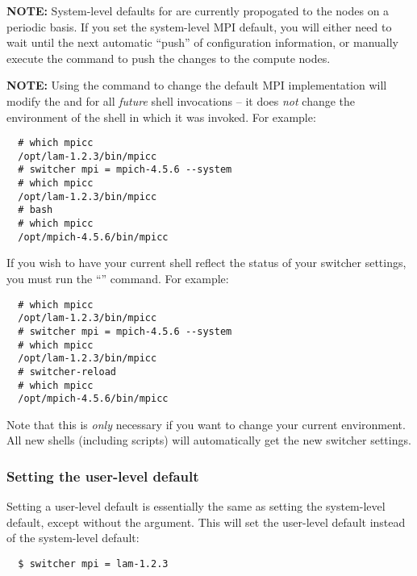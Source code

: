 {\bf NOTE:} System-level defaults for  are currently
propogated to the nodes on a periodic basis.  If you set the
system-level MPI default, you will either need to wait until the next
automatic ``push'' of configuration information, or manually execute
the  command to push the changes to
the compute nodes.

{\bf NOTE:} Using the  command to change the default MPI
implementation will modify the  and  for all
{\em future} shell invocations -- it does {\em not} change the
environment of the shell in which it was invoked.  For example:

\begin{verbatim}
  # which mpicc
  /opt/lam-1.2.3/bin/mpicc
  # switcher mpi = mpich-4.5.6 --system
  # which mpicc
  /opt/lam-1.2.3/bin/mpicc
  # bash
  # which mpicc
  /opt/mpich-4.5.6/bin/mpicc
\end{verbatim}

If you wish to have your current shell reflect the status of your
switcher settings, you must run the ``''
command.  For example:

\begin{verbatim}
  # which mpicc
  /opt/lam-1.2.3/bin/mpicc
  # switcher mpi = mpich-4.5.6 --system
  # which mpicc
  /opt/lam-1.2.3/bin/mpicc
  # switcher-reload
  # which mpicc
  /opt/mpich-4.5.6/bin/mpicc
\end{verbatim}

Note that this is {\em only} necessary if you want to change your
current environment.  All new shells (including scripts) will
automatically get the new switcher settings.


\subsubsection{Setting the user-level default}

Setting a user-level default is essentially the same as setting the
system-level default, except without the  argument.
This will set the user-level default instead of the system-level
default:

\begin{verbatim}
  $ switcher mpi = lam-1.2.3
\end{verbatim}


